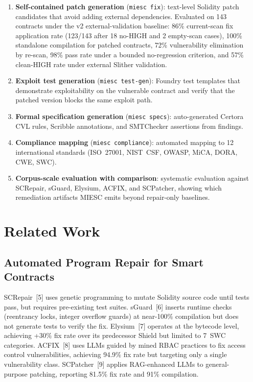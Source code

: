 \documentclass[conference]{IEEEtran}
\begin{document}
\begin{enumerate}
    \item \textbf{Self-contained patch generation} (\texttt{miesc fix}): text-level Solidity patch candidates that avoid adding external dependencies. Evaluated on 143 contracts under the v2 external-validation baseline: 86\% current-scan fix application rate (123/143 after 18 no-HIGH and 2 empty-scan cases), 100\% standalone compilation for patched contracts, 72\% vulnerability elimination by re-scan, 98\% pass rate under a bounded no-regression criterion, and 57\% clean-HIGH rate under external Slither validation.
    \item \textbf{Exploit test generation} (\texttt{miesc test-gen}): Foundry test templates that demonstrate exploitability on the vulnerable contract and verify that the patched version blocks the same exploit path.
    \item \textbf{Formal specification generation} (\texttt{miesc specs}): auto-generated Certora CVL rules, Scribble annotations, and SMTChecker assertions from findings.
    \item \textbf{Compliance mapping} (\texttt{miesc compliance}): automated mapping to 12 international standards (ISO~27001, NIST~CSF, OWASP, MiCA, DORA, CWE, SWC).
    \item \textbf{Corpus-scale evaluation with comparison}: systematic evaluation against SCRepair, sGuard, Elysium, ACFIX, and SCPatcher, showing which remediation artifacts MIESC emits beyond repair-only baselines.
\end{enumerate}

\section{Related Work}

\subsection{Automated Program Repair for Smart Contracts}

SCRepair~[5] uses genetic programming to mutate Solidity source code until tests pass, but requires pre-existing test suites. sGuard~[6] inserts runtime checks (reentrancy locks, integer overflow guards) at near-100\% compilation but does not generate tests to verify the fix. Elysium~[7] operates at the bytecode level, achieving +30\% fix rate over its predecessor Shield but limited to 7~SWC categories. ACFIX~[8] uses LLMs guided by mined RBAC practices to fix access control vulnerabilities, achieving 94.9\% fix rate but targeting only a single vulnerability class. SCPatcher~[9] applies RAG-enhanced LLMs to general-purpose patching, reporting 81.5\% fix rate and 91\% compilation.
\end{document}
